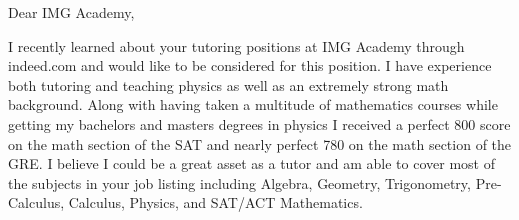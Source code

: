 \documentclass{resume} %
\begin{document}

\begin{rSection}{}
Dear IMG Academy,

I recently learned about your tutoring positions at IMG Academy through indeed.com and would like to be considered for this position. I have experience both tutoring and teaching physics as well as an extremely strong math background. Along with having taken a multitude of mathematics courses while getting my bachelors and masters degrees in physics I received a perfect 800 score on the math section of the SAT and nearly perfect 780 on the math section of the GRE. I believe I could be a great asset as a tutor and am able to cover most of the subjects in your job listing including Algebra, Geometry, Trigonometry, Pre-Calculus, Calculus, Physics, and SAT/ACT Mathematics.






\end{rSection}


\end{document}
